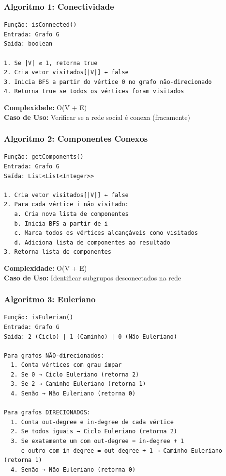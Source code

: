 \documentclass[12pt,a4paper]{article}
\begin{document}
    \subsubsection{Algoritmo 1: Conectividade}

    \begin{verbatim}
Função: isConnected()
Entrada: Grafo G
Saída: boolean

1. Se |V| ≤ 1, retorna true
2. Cria vetor visitados[|V|] ← false
3. Inicia BFS a partir do vértice 0 no grafo não-direcionado
4. Retorna true se todos os vértices foram visitados
    \end{verbatim}

    \textbf{Complexidade:} O(V + E) \\
    \textbf{Caso de Uso:} Verificar se a rede social é conexa (fracamente)

    \subsubsection{Algoritmo 2: Componentes Conexos}

    \begin{verbatim}
Função: getComponents()
Entrada: Grafo G
Saída: List<List<Integer>>

1. Cria vetor visitados[|V|] ← false
2. Para cada vértice i não visitado:
   a. Cria nova lista de componentes
   b. Inicia BFS a partir de i
   c. Marca todos os vértices alcançáveis como visitados
   d. Adiciona lista de componentes ao resultado
3. Retorna lista de componentes
    \end{verbatim}

    \textbf{Complexidade:} O(V + E) \\
    \textbf{Caso de Uso:} Identificar subgrupos desconectados na rede

    \subsubsection{Algoritmo 3: Euleriano}

    \begin{verbatim}
Função: isEulerian()
Entrada: Grafo G
Saída: 2 (Ciclo) | 1 (Caminho) | 0 (Não Euleriano)

Para grafos NÃO-direcionados:
  1. Conta vértices com grau ímpar
  2. Se 0 → Ciclo Euleriano (retorna 2)
  3. Se 2 → Caminho Euleriano (retorna 1)
  4. Senão → Não Euleriano (retorna 0)

Para grafos DIRECIONADOS:
  1. Conta out-degree e in-degree de cada vértice
  2. Se todos iguais → Ciclo Euleriano (retorna 2)
  3. Se exatamente um com out-degree = in-degree + 1
     e outro com in-degree = out-degree + 1 → Caminho Euleriano (retorna 1)
  4. Senão → Não Euleriano (retorna 0)
    \end{verbatim}
\end{document}
